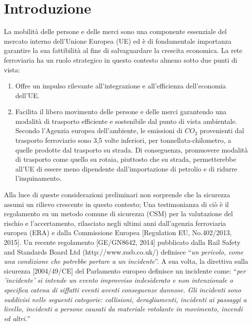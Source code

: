 \chapter{Introduzione}

\label{ch:introduzione}
La mobilità delle persone e delle merci sono una componente essenziale del mercato interno dell'Unione Europea (UE) ed è di fondamentale importanza garantire la sua fattibilità al fine di salvaguardare la crescita economica.
La rete ferroviaria ha un ruolo strategico in questo contesto almeno sotto due punti di vista:
\begin{enumerate}
\item Offre un impulso rilevante all'integrazione e all'efficienza dell'economia dell'UE.
\item Facilita il libero movimento delle persone e delle merci garantendo una modalità di trasporto efficiente e sostenibile dal punto di vista ambientale. Secondo l’Agenzia europea dell’ambiente, le emissioni di $CO_2$ provenienti dal trasporto ferroviario sono
3,5 volte inferiori, per tonnellata-chilometro, a quelle prodotte dal trasporto su strada. Di conseguenza, promuovere modalità di trasporto come quello su rotaia, piuttosto che su strada, permetterebbe all'UE di essere meno dipendente dall'importazione di petrolio e di ridurre l'inquinamento.
\end{enumerate}

Alla luce di queste considerazioni preliminari non sorprende che la sicurezza assumi un rilievo crescente in questo contesto; Una testimonianza di ciò è il regolamento su un metodo comune di sicurezza (CSM) per la valutazione del rischio e l’accertamento, rilasciato negli ultimi anni dall’agenzia ferroviaria europea (ERA) e dalla Commissione Europea [Regulation EU, No.402/2013, 2015].
Un recente regolamento [GE/GN8642, 2014] pubblicato dalla Rail Safety and Standards Board Ltd (http://www.rssb.co.uk/) definisce “\textit{un pericolo, come una condizione che potrebbe portare a un incidente}”. A sua volta, la direttiva sulla sicurezza [2004/49/CE] del Parlamento europeo definisce un incidente come: “\textit{per 'incidente' si intende un evento improvviso indesiderato e non intenzionale o specifica catena di siffatti eventi aventi conseguenze dannose. Gli incidenti sono suddivisi nelle seguenti categorie: collisioni, deragliamenti, incidenti ai passaggi a livello, incidenti a persone causati da materiale rotolante in movimento, incendi ed altri.}”\newline

